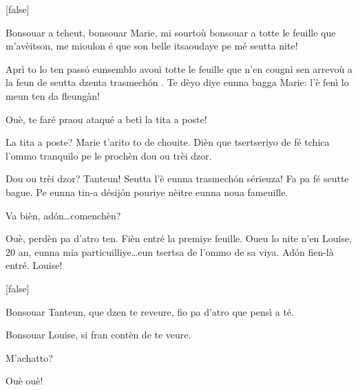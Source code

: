 \begin{drama}
[false]%


\Tanteunspeaks Bonsouar a tcheut, bonsouar Marie, mi sourtoù bonsouar a totte le feuille que m'avèitson, me mioulon é que son belle itsaoudaye pe mé seutta nite! 


\Tanteunspeaks{} Aprì to lo ten pass\'o eunsemblo avouì totte le feuille que n’en cougnì sen arrevoù a la feun de seutta dzenta trasmech\'on . Te dèyo diye eunna bagga Marie: l'è fenì lo meun ten da fleungàn!

\Mariespeaks  Ouè, te faré praou ataqué a betì la tita a poste!

\Tanteunspeaks La tita a poste? Marie t’arito to de chouite. Dièn que tsertseriyo de fé tchica l'ommo tranquilo pe le prochèn dou ou trèi dzor.

\Mariespeaks Dou ou trèi dzor? Tanteun! Seutta l'è eunna trasmech\'on sérieuza! Fa pa fé seutte bague. Pe eunna tin-a désij\'on pouriye nèitre eunna noua fameuille.

\Tanteunspeaks{} Va bièn, ad\'on\ldots comenchèn?

\Mariespeaks Ouè, perdèn pa d'atro ten. Fièn entré la premiye feuille. Oueu lo nite n'en Louise, 20 an, eunna mia particuilliye\ldots eun tsertsa de l'ommo de sa viya. Ad\'on fien-là entré. Louise!

[false]%


\Louisespeaks Bonsouar Tanteun, que dzen te reveure, fio pa d'atro que pensì a té.

\Tanteunspeaks{} Bonsouar Louise,  si fran contèn de te veure.

\Louisespeaks M'achatto?

\Tanteunspeaks Ouè ouè!


\end{drama}

